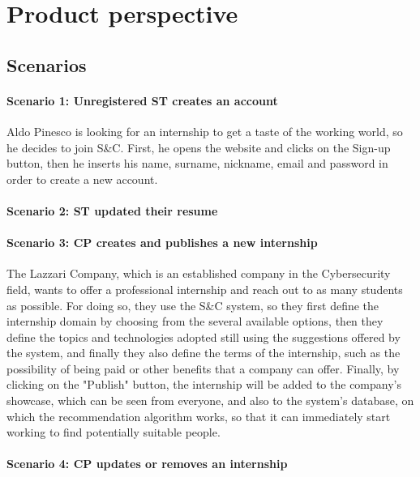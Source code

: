 \section{Product perspective}
\label{sec:product_perspective}%

\subsection{Scenarios}
\label{subsec:scenarios}%
\paragraph{Scenario 1: Unregistered ST creates an account}
Aldo Pinesco is looking for an internship to get a taste of the working world, so he decides to join S\&C. First, he opens the website and clicks on the Sign-up button, then he inserts his name, surname, nickname, email and password in order to create a new account.

\paragraph{Scenario 2: ST updated their resume}

\paragraph{Scenario 3: CP creates and publishes a new internship}
The Lazzari Company, which is an established company in the Cybersecurity field, wants to offer a professional internship and reach out to as many students as possible. For doing so, they use the S\&C system, so they first define the internship domain by choosing from the several available options, then they define the topics and technologies adopted still using the suggestions offered by the system, and finally they also define the terms of the internship, such as the possibility of being paid or other benefits that a company can offer. Finally, by clicking on the "Publish" button, the internship will be added to the company's showcase, which can be seen from everyone, and also to the system's database, on which the recommendation algorithm works, so that it can immediately start working to find potentially suitable people.

\paragraph{Scenario 4: CP updates or removes an internship }

